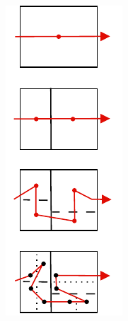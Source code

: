 \begin{figure}
\begin{minipage}{0.13\textwidth}
\begin{subfigure}[b]{\textwidth}
        \includegraphics[width=\textwidth]{images/sfc_traversal.svg.pdf}
        \caption{}
        \label{fig:sfc_traversal}
    \end{subfigure}
\end{minipage}


\end{figure}
